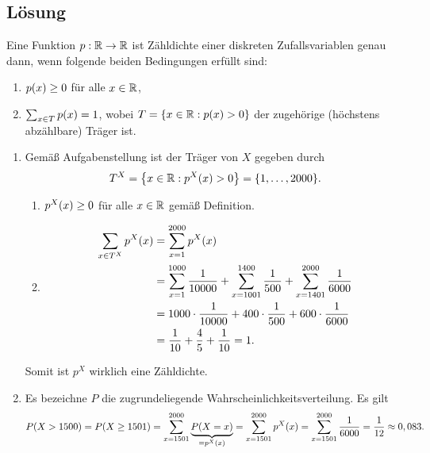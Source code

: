 \documentclass{exercise}
\begin{document}
    \subsection*{Lösung}
    Eine Funktion \(p: \mathbb{R} \to \mathbb{R}\) ist Zähldichte einer diskreten Zufallsvariablen genau dann, wenn folgende beiden Bedingungen erfüllt sind:
    \begin{enumerate}[label=(\roman*)]
        \item \(p\parentheses*{x} \ge 0\) für alle \(x \in \mathbb{R}\),
        \item \(\sum_{x \in T}p\parentheses*{x} = 1\), wobei \(T = \braces*{x \in \R : p\parentheses*{x} > 0}\) der zugehörige (höchstens abzählbare) Träger ist.
    \end{enumerate}
    \begin{enumerate}
        \item Gemäß Aufgabenstellung ist der Träger von \(X\) gegeben durch
        \[
            T^X = \braces*{x \in \R : p^X\parentheses*{x} > 0} = \braces*{1, \ldots, 2000}.
        \]
        \begin{enumerate}
            \item \(p^X\parentheses*{x} \ge 0\) für alle \(x \in \mathbb{R}\) gemäß Definition.
            \item
            \begin{align*}
                \sum_{x \in T^X}p^X\parentheses*{x} &= \sum_{x = 1}^{2000}p^X\parentheses*{x}\\
                &= \sum_{x = 1}^{1000}\frac{1}{10000} + \sum_{x = 1001}^{1400}\frac{1}{500} + \sum_{x = 1401}^{2000}\frac{1}{6000}\\
                &= 1000 \cdot \frac{1}{10000} + 400 \cdot \frac{1}{500} + 600 \cdot \frac{1}{6000}\\
                &= \frac{1}{10} + \frac{4}{5} + \frac{1}{10} = 1.
            \end{align*}
        \end{enumerate}
        Somit ist \(p^X\) wirklich eine Zähldichte.
        \item Es bezeichne \(P\) die zugrundeliegende Wahrscheinlichkeitsverteilung.
        Es gilt
        \[
            P\parentheses*{X > 1500} = P\parentheses*{X \ge 1501} = \sum_{x = 1501}^{2000}\underbrace{P\parentheses*{X = x}}_{= p^X\parentheses*{x}} = \sum_{x = 1501}^{2000}p^X\parentheses*{x} = \sum_{x = 1501}^{2000}\frac{1}{6000} = \frac{1}{12} \approx 0,083.
        \]
    \end{enumerate}
\end{document}
